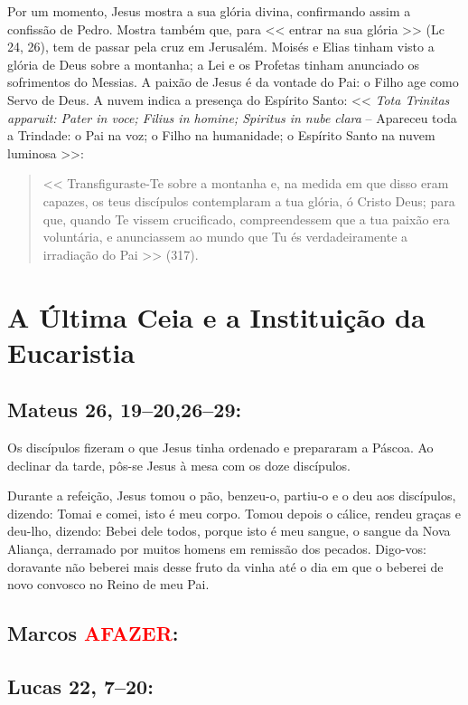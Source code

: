 \documentclass[10pt,a5paper]{book}
\newcommand{\from}[1]{\subsection*{#1}}
\newcommand{\TODO}{\textcolor{red}{\ttfamily AFAZER}}
\begin{document}
Por um momento, Jesus mostra a sua glória divina, confirmando assim a confissão de Pedro.
Mostra também que, para << entrar na sua glória >> (Lc 24, 26), tem de passar pela cruz em Jerusalém.
Moisés e Elias tinham visto a glória de Deus sobre a montanha;
a Lei e os Profetas tinham anunciado os sofrimentos do Messias.
A paixão de Jesus é da vontade do Pai:
o Filho age como Servo de Deus.
A nuvem indica a presença do Espírito Santo:
<< \emph{Tota Trinitas apparuit: Pater in voce; Filius in homine; Spiritus in nube clara} -- Apareceu toda a Trindade:
o Pai na voz; o Filho na humanidade; o Espírito Santo na nuvem luminosa >>:
\begin{quote}
<< Transfiguraste-Te sobre a montanha e, na medida em que disso eram capazes, os teus discípulos contemplaram a tua glória, ó Cristo Deus;
para que, quando Te vissem crucificado, compreendessem que a tua paixão era voluntária, e anunciassem ao mundo que Tu és verdadeiramente a irradiação do Pai >> (317).
\end{quote}


\section{A Última Ceia e a Instituição da Eucaristia}

\from{Mateus 26, 19--20,26--29:}

Os discípulos fizeram o que Jesus tinha ordenado e prepararam a Páscoa.
Ao declinar da tarde, pôs-se Jesus à mesa com os doze discípulos.

Durante a refeição, Jesus tomou o pão, benzeu-o, partiu-o e o deu aos discípulos, dizendo:
Tomai e comei, isto é meu corpo.
Tomou depois o cálice, rendeu graças e deu-lho, dizendo:
Bebei dele todos, porque isto é meu sangue, o sangue da Nova Aliança, derramado por muitos homens em remissão dos pecados.
Digo-vos:
doravante não beberei mais desse fruto da vinha até o dia em que o beberei de novo convosco no Reino de meu Pai.

\from{Marcos \TODO:}

\from{Lucas 22, 7--20:}
\end{document}
